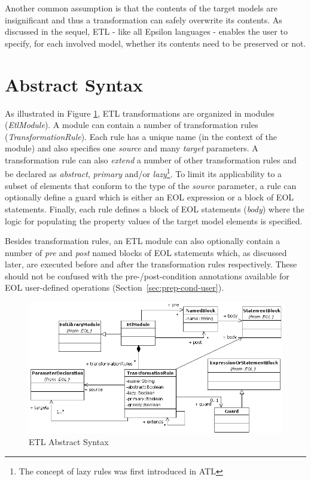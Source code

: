 Another common assumption is that the contents of the target models are insignificant and thus a transformation can safely overwrite its contents. As discussed in the sequel, ETL - like all Epsilon languages - enables the user to specify, for each involved model, whether its contents need to be preserved or not.

\section{Abstract Syntax}

As illustrated in Figure \ref{fig:EtlAbstractSyntax}, ETL transformations are organized in modules (\emph{EtlModule}). A module can contain a number of transformation rules (\emph{TransformationRule}). Each rule has a unique name (in the context of the module) and also specifies one \emph{source} and many \emph{target} parameters. A transformation rule can also \emph{extend} a number of other transformation rules and be declared as \emph{abstract}, \emph{primary} and/or \emph{lazy}\footnote{The concept of lazy rules was first introduced in ATL}. To limit its applicability to a subset of elements that conform to the type of the \emph{source} parameter, a rule can optionally define a guard which is either an EOL expression or a block of EOL statements. Finally, each rule defines a block of EOL statements (\emph{body}) where the logic for populating the property values of the target model elements is specified.

Besides transformation rules, an ETL module can also optionally contain a number of \emph{pre} and \emph{post} named blocks of EOL statements which, as discussed later, are executed before and after the transformation rules respectively. These should not be confused with the pre-/post-condition annotations available for EOL user-defined operations (Section~\ref{sec:prep-cond-user}).

\begin{landscape}
\begin{figure}
	\centering
		\includegraphics{images/EtlAbstractSyntax.png}
	\caption{ETL Abstract Syntax}
	\label{fig:EtlAbstractSyntax}
\end{figure}
\end{landscape}

